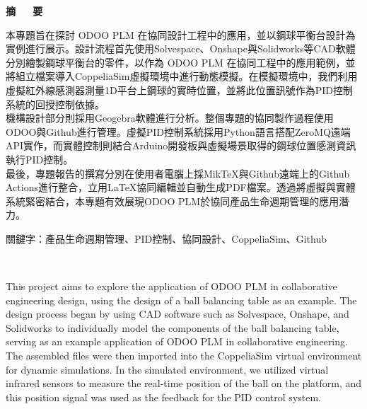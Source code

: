 \renewcommand{\baselinestretch}{1.5} %
\clearpage  %
\sectionef
{} %
\begin{center}
\LARGE\textbf{摘~~~要}\\
\end{center}

\justifying
\fontsize{14pt}{20pt}\sectionef\hspace{12pt}\quad 本專題旨在探討 ODOO PLM 在協同設計工程中的應用，並以鋼球平衡台設計為實例進行展示。設計流程首先使用Solvespace、Onshape與Solidworks等CAD軟體分別繪製鋼球平衡台的零件，以作為 ODOO PLM 在協同工程中的應用範例，並將組立檔案導入CoppeliaSim虛擬環境中進行動態模擬。在模擬環境中，我們利用虛擬紅外線感測器測量1D平台上鋼球的實時位置，並將此位置訊號作為PID控制系統的回授控制依據。\\

\fontsize{14pt}{20pt}\sectionef\hspace{12pt}\quad 機構設計部分則採用Geogebra軟體進行分析。整個專題的協同製作過程使用ODOO與Github進行管理。虛擬PID控制系統採用Python語言搭配ZeroMQ遠端API實作，而實體控制則結合Arduino開發板與虛擬場景取得的鋼球位置感測資訊執行PID控制。\\

\fontsize{14pt}{20pt}\sectionef\hspace{12pt}\quad 最後，專題報告的撰寫分別在使用者電腦上採MikTeX與Github遠端上的Github Actions進行整合，立用LaTeX協同編輯並自動生成PDF檔案。透過將虛擬與實體系統緊密結合，本專題有效展現ODOO PLM於協同產品生命週期管理的應用潛力。\\


\begin{hangparas}{1.5cm}{1}
\fontsize{14pt}{20pt}\sectionef
關鍵字：產品生命週期管理、PID控制、協同設計、CoppeliaSim、Github
\end{hangparas}
\newpage
\begin{center}
\renewcommand{\baselinestretch}{1.5} %
\LARGE\textbf{}\\
\end{center}

\justifying\fontsize{14pt}{16pt}\sectionef\hspace{12pt}\quad This project aims to explore the application of ODOO PLM in collaborative engineering design, using the design of a ball balancing table as an example. The design process began by using CAD software such as Solvespace, Onshape, and Solidworks to individually model the components of the ball balancing table, serving as an example application of ODOO PLM in collaborative engineering. The assembled files were then imported into the CoppeliaSim virtual environment for dynamic simulations. In the simulated environment, we utilized virtual infrared sensors to measure the real-time position of the ball on the platform, and this position signal was used as the feedback for the PID control system.\\

